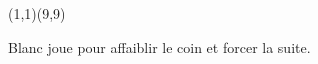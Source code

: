 \documentclass[preview, border=0pt, varwidth=false]{standalone}
\begin{document}
	\setgounit{0.6cm} 
	
	\parbox[c][14.65cm][c]{10.2cm}{
		\centering
		\begin{psgopartialboard}{(1,1)(9,9)}
			\pass
		\end{psgopartialboard}
		
		\vspace{1em}
		Blanc joue  pour affaiblir le coin et forcer la suite.
	}
	
\end{document}
